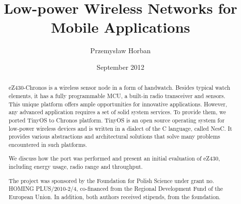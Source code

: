 \documentclass{pracamgr}
\author{Przemysław Horban}
\title{Low-power Wireless Networks for Mobile Applications}
\date{September 2012}
\begin{document}
\maketitle

\begin{abstract}
eZ430-Chronos is a wireless sensor node in a form of handwatch. Besides typical watch elements, it has a fully programmable MCU, a built-in radio transceiver and sensors. This unique platform offers ample opportunities for innovative applications. However, any advanced application requires a set of solid system services. To provide them, we ported TinyOS to Chronos platform. TinyOS is an open source operating system for low-power wireless devices and is written in a dialect of the C language, called NesC. It provides various abstractions and architectural solutions that solve many problems encountered in such platforms.

We discuss how the port was performed and present an initial evaluation of eZ430, including energy usage, radio range and throughput.

The project was sponsored by the Foundation for Polish Science under grant no. HOMING PLUS/2010-2/4, co-financed from the Regional Development Fund of the European Union. In addition, both authors received stipends, from the foundation.
\end{abstract}

\tableofcontents














% 





\appendix




\end{document}
